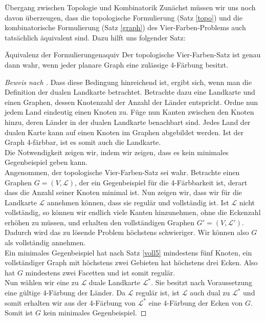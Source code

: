 \begin{chapter}{Übergang zwischen Topologie und Kombinatorik}
 Zunächst müssen wir uns noch davon überzeugen, dass die topologische Formulierung (Satz \ref{topo}) und die kombinatorische Formulierung (Satz \ref{graph}) des Vier-Farben-Problems auch tatsächlich äquivalent sind. Dazu hilft uns folgender Satz:
 
 \begin{satzl}{Äquivalenz der Formulierungen}{aquiv}
  Der topologische Vier-Farben-Satz ist genau dann wahr, wenn jeder planare Graph eine zulässige 4-Färbung besitzt.
 \end{satzl}
 
 \begin{proof}[Beweis nach \cite{fritsch}]
  Dass diese Bedingung hinreichend ist, ergibt sich, wenn man die Definition der dualen Landkarte betrachtet. Betrachte dazu eine Landkarte und einen Graphen, dessen Knotenzahl der Anzahl der Länder entspricht. Ordne nun jedem Land eindeutig einen Knoten zu. Füge nun Kanten zwischen den Knoten hinzu, deren Länder in der dualen Landkarte benachbart sind. Jedes Land der dualen Karte kann auf einen Knoten im Graphen abgebildet werden. Ist der Graph 4-färbbar, ist es somit auch die Landkarte.\\
  Die Notwendigkeit zeigen wir, indem wir zeigen, dass es kein minimales Gegenbeispiel geben kann.\\
  Angenommen, der topologische Vier-Farben-Satz sei wahr. Betrachte einen Graphen $G=(V,\mathcal{L})$, der ein Gegenbeispiel für die 4-Färbbarkeit ist, derart dass die Anzahl seiner Knoten minimal ist. Nun zeigen wir, dass wir für die Landkarte $\mathcal{L}$ annehmen können, dass sie regulär und vollständig ist. Ist $\mathcal{L}$ nicht vollständig, so können wir endlich viele Kanten hinzunehmen, ohne die Eckenzahl erhöhen zu müssen, und erhalten den vollständigen Graphen $G' = (V,\mathcal{L}')$. Dadurch wird das zu lösende Problem höchstens schwieriger. Wir können also $G$ als vollständig annehmen. \\
  Ein minimales Gegenbeispiel hat nach Satz \ref{voll5} mindestens fünf Knoten, ein vollständiger Graph mit höchstens zwei Gebieten hat höchstens drei Ecken. Also hat $G$ mindestens zwei Facetten und ist somit regulär.\\
  Nun wählen wir eine zu $\mathcal{L}$ duale Landkarte $\mathcal{L}^*$. Sie besitzt nach Voraussetzung eine gültige 4-Färbung der Länder. Da $\mathcal{L}$ regulär ist, ist $\mathcal{L}$ auch dual zu $\mathcal{L}^*$ und somit erhalten wir aus der 4-Färbung von $\mathcal{L}^*$ eine 4-Färbung der Ecken von $G$. Somit ist $G$ kein minimales Gegenbeispiel.
 \end{proof}

\end{chapter}